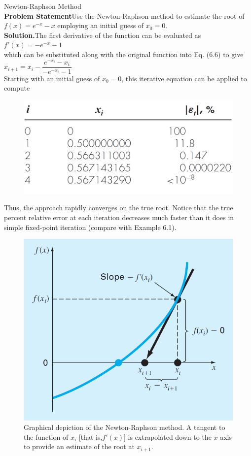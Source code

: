 \documentclass[../main.tex]{subfiles}
\begin{document}
\begin{example} Newton-Raphson Method\\

    \noindent\textbf{Problem Statement}\quad Use the Newton-Raphson method to estimate the root of $f (x) =e^{-x} - x$
     employing an initial guess of $x_0 = 0$.\\

    \noindent\textbf{Solution.}\quad The first derivative of the function can be evaluated as\\

     $f'(x) = -e^{-x}-1$\\

    \noindent which can be substituted along with the original function into Eq. (6.6) to give\\

    $x_{i+1}= x_i-\dfrac{e^{-x_i}-x_i}{-e^{-x_i}-1}$\\

    \noindent Starting with an initial guess of $x_0 = 0$, this iterative equation can be applied to compute

    \begin{figure}[h]
        \includegraphics[width=0.4\linewidth]{./images/example_6_2_1}
    \end{figure}

    \noindent Thus, the approach rapidly converges on the true root. Notice that the true percent relative
    error at each iteration decreases much faster than it does in simple fixed-point iteration
    (compare with Example 6.1).
\end{example}

\begin{figure}[h]
    \includegraphics[width=0.55\linewidth]{./images/fig_6_4}
    \caption{Graphical depiction of the Newton-Raphson method. A tangent to the function of $x_i$ [that is,$f'(x)$] 
    is extrapolated down to the $x$ axis to provide an estimate of the root at $x_{i+1}$.}
\end{figure}
\end{document}
